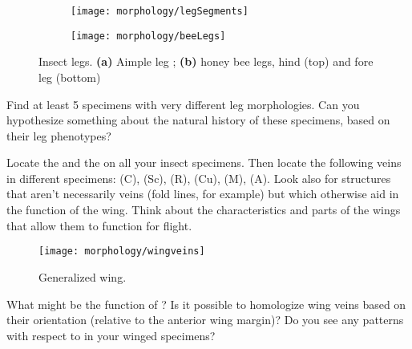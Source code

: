 \begin{figure}[ht!]
    \centering
    \begin{subfigure}[ht!]{0.5\textwidth}
        \texttt{[image: morphology/legSegments]}
        \caption{}
        \label{fig:legSegments}
    \end{subfigure}
    \qquad
    \begin{subfigure}[ht!]{0.3\textwidth}
        \texttt{[image: morphology/beeLegs]}
        \caption{}
        \label{fig:beeLegs}
    \end{subfigure}
    \caption{Insect legs. \textbf{(a)} Aimple leg \citep[][Fig. 24, after Snodgrass]{bhlitem16791elementary}; \textbf{(b)} honey bee legs, hind (top) and fore leg (bottom) \citep[][Fig. 65]{bhl128276}}
\end{figure}%

\begin{theo}
{}Find at least 5 specimens with very different leg morphologies. Can you hypothesize something about the natural history of these specimens, based on their leg phenotypes?
\end{theo}\vspace{3mm}

\noindent{}Locate the  and the  on all your insect specimens. Then locate the following veins in different specimens:  (C),  (Sc),  (R),  (Cu),  (M),  (A). Look also for structures that aren't necessarily veins (fold lines, for example) but which otherwise aid in the function of the wing. Think about the characteristics and parts of the wings that allow them to function for flight.\vspace{3mm}

\begin{figure}[ht!]
  \centering
    \texttt{[image: morphology/wingveins]}
  \caption{Generalized wing. \citep[][Fig. 6]{snodgrass1910honeybee}}
  \label{fig:wingveins}
\end{figure}

\begin{theo}
{}What might be the function of ? Is it possible to homologize wing veins based on their orientation (relative to the anterior wing margin)? Do you see any patterns with respect to  in your winged specimens?
\end{theo}\vspace{3mm}

